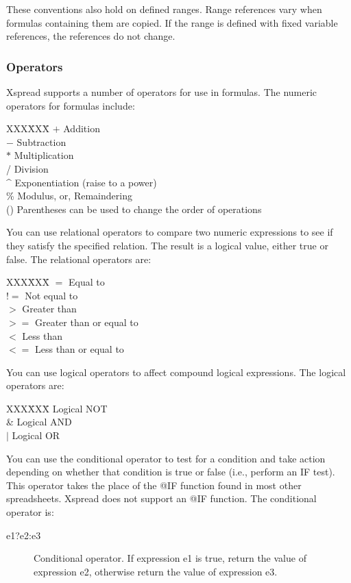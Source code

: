     These conventions also hold on defined ranges.  Range references vary when 
formulas containing them are copied.  If the range is defined with fixed 
variable references, the references do not change.

\subsubsection*{Operators}

    Xspread supports a number of operators for use in formulas.  The numeric 
operators for formulas include:
\begin{tabbing}
XXX\=XXX\=\kill
 \> $+$ \> 	Addition\\
 \> $-$ \> 	Subtraction\\
 \> $*$ \> 	Multiplication\\
 \> /   \> 	Division\\
 \> \^{ } \>   	Exponentiation (raise to a power)\\
 \> \%   \> 	Modulus, or, Remaindering\\
 \> ()  \> 	Parentheses can be used to change the order of operations
\end{tabbing}

    You can use relational operators to compare two numeric expressions to see 
if they satisfy the specified relation.  The result is a logical value, either 
true or false.  The relational operators are:
\begin{tabbing}
XXX\=XXX\=\kill
\>    $=$   \> Equal to\\
\>   $!=$  \> Not equal to\\
\>     $>$   \> Greater than\\
\>    $>=$  \> Greater than or equal to\\
\>    $<$   \> Less than\\
\>    $<=$  \> Less than or equal to
\end{tabbing}

    You can use logical operators to affect compound logical expressions.  The 
logical operators are:
\begin{tabbing}
XXX\=XXX\=\kill
 \>   \twiddle \>  Logical NOT\\
 \>   \& \>  Logical AND\\
 \>   $|$  \> Logical OR\\
\end{tabbing}

    You can use the conditional operator to test for a condition and take 
action depending on whether that condition is true or false (i.e., perform an 
IF test).  This operator takes the place of the @IF function found in most 
other spreadsheets.  Xspread does not support an @IF function.  The 
conditional operator is:
\begin{description}
\item[e1?e2:e3]{Conditional operator.  If expression e1 is true, return the
value of expression e2, otherwise return the value of 
expression e3.}
\end{description}

